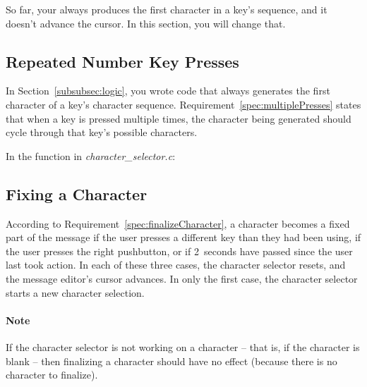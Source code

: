 
So far, your always produces the first character in a key's sequence, and it doesn't advance the cursor.
In this section, you will change that.

\subsection{Repeated Number Key Presses} \label{subsec:characterSequencing}

In Section~\ref{subsubsec:logic}, you wrote code that always generates the first character of a key's character sequence.
Requirement~\ref{spec:multiplePresses} states that when a key is pressed multiple times, the character being generated should cycle through that key's possible characters.

In the  function in \textit{character\_selector.c}:
\begin{description}
\end{description}


\subsection{Fixing a Character} \label{subsec:finalizeCharacter}

According to Requirement~\ref{spec:finalizeCharacter}, a character becomes a fixed part of the message if the user presses a different key than they had been using, if the user presses the right pushbutton, or if 2~seconds have passed since the user last took action.
In each of these three cases, the character selector resets, and the message editor's cursor advances.
In only the first case, the character selector starts a new character selection.

\paragraph{Note} If the character selector is not working on a character -- that is, if the character is blank -- then finalizing a character should have no effect (because there is no character to finalize). \\

